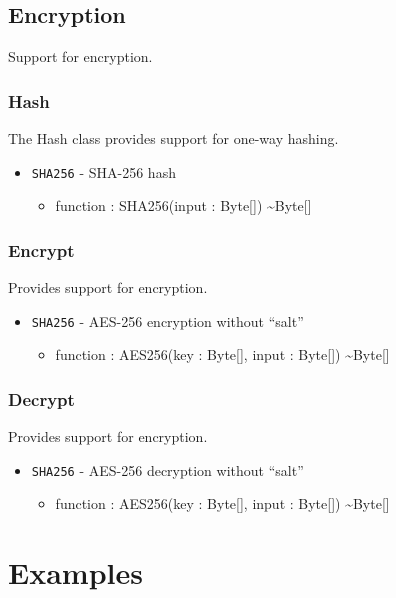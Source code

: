\documentclass[11pt]{article}
\begin{document}
\subsection{Encryption}
Support for encryption.

\subsubsection{Hash}
The Hash class provides support for one-way hashing.

\begin{itemize}
\item \texttt{SHA256} - SHA-256 hash
  \begin{itemize}
  \item function : SHA256(input : Byte[]) \textasciitilde Byte[]
  \end{itemize}
\end{itemize}

\subsubsection{Encrypt}
Provides support for encryption.

\begin{itemize}
\item \texttt{SHA256} - AES-256 encryption without ``salt''
  \begin{itemize}
  \item function : AES256(key : Byte[], input : Byte[])
    \textasciitilde Byte[]
  \end{itemize}
\end{itemize}

\subsubsection{Decrypt}
Provides support for encryption.

\begin{itemize}
\item \texttt{SHA256} - AES-256 decryption without ``salt''
  \begin{itemize}
  \item function : AES256(key : Byte[], input : Byte[])
    \textasciitilde Byte[]
  \end{itemize}
\end{itemize}


\newpage


\section{Examples}
\end{document}
